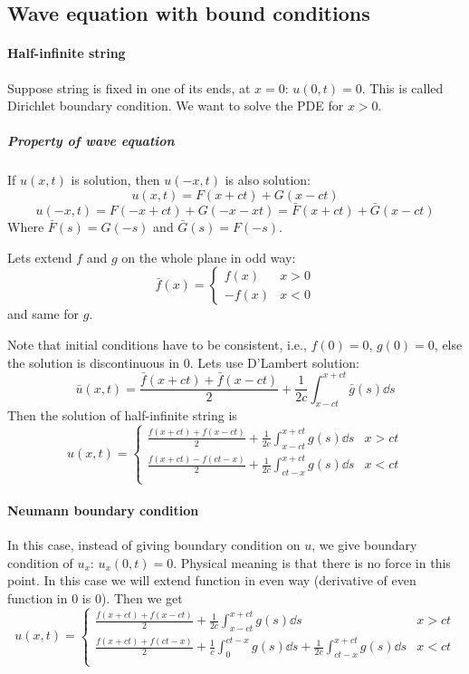 \subsection{Wave equation with bound conditions}
\paragraph{Half-infinite string}
Suppose string is fixed in one of its ends, at $x=0$: $u(0,t) = 0$. This is called Dirichlet boundary condition. We want to solve the PDE for $x>0$.

\subparagraph{Property of wave equation}
If $u(x,t)$ is solution, then $u(-x,t)$ is also solution:
$$u(x,t) = F(x+ct) + G(x-ct)$$
$$u(-x,t) = F(-x+ct)+G(-x-xt) = \bar{F}(x+ct) + \bar{G}(x-ct)$$
Where $\bar{F}(s) = G(-s)$ and $\bar{G}(s) = F(-s)$.

Lets extend $f$ and $g$ on the whole plane in odd way:
$$\bar{f}(x) = \begin{cases}
f(x) & x>0\\
-f(x) & x<0
\end{cases}$$
and same for $g$. 

Note that initial conditions have to be consistent, i.e., $f(0)=0$, $g(0)=0$, else the solution is discontinuous in 0.
Lets use D'Lambert solution:
$$\bar{u}(x,t) = \frac{\bar{f}(x+ct) + \bar{f}(x-ct)}{2} + \frac{1}{2c} \int_{x-ct}^{x+ct} \bar{g}(s) \dd{s}$$
Then the solution of half-infinite string is
$$u(x,t) = \begin{cases}
\frac{f(x+ct) + f(x-ct)}{2} + \frac{1}{2c} \int_{x-ct}^{x+ct} g(s) \dd{s}& x>ct\\
\frac{f(x+ct) - f(ct-x)}{2} + \frac{1}{2c} \int_{ct-x}^{x+ct} g(s) \dd{s}& x<ct\\
\end{cases}$$ 
\paragraph{Neumann boundary condition}
In this case, instead of giving boundary condition on $u$, we give boundary condition of $u_x$: $u_x(0,t) = 0$. Physical meaning is that there is no force in this point. In this case we will extend function in even way (derivative of even function in 0 is 0). Then we get$$u(x,t) = \begin{cases}
\frac{f(x+ct) + f(x-ct)}{2} + \frac{1}{2c} \int_{x-ct}^{x+ct} g(s) \dd{s}& x>ct\\
\frac{f(x+ct) + f(ct-x)}{2} + \frac{1}{c} \int_{0}^{ct-x} g(s) \dd{s} + \frac{1}{2c} \int_{ct-x}^{x+ct} g(s) \dd{s}& x<ct\\
\end{cases}$$ 
